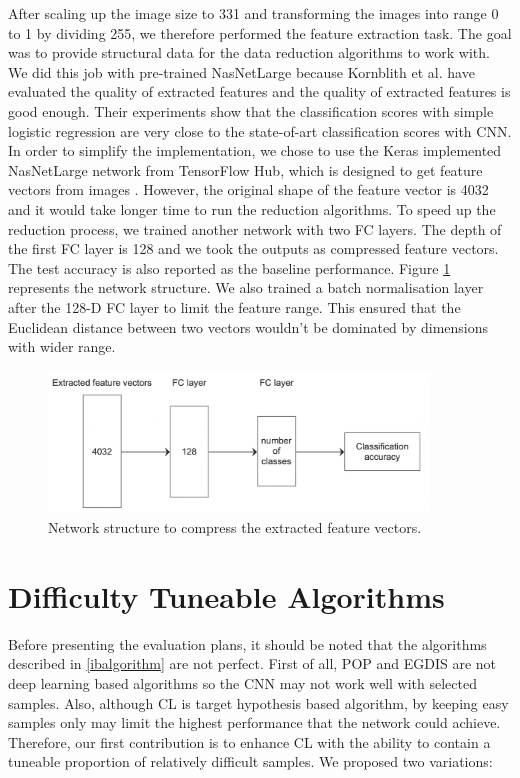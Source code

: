 After scaling up the image size to 331 and transforming the images into range 0 to 1 by dividing 255, we therefore performed the feature extraction task. The goal was to provide structural data for the data reduction algorithms to work with. We did this job with pre-trained NasNetLarge \cite{Zoph2018} because Kornblith et al. \cite{Kornblith2018} have evaluated the quality of extracted features and the quality of extracted features is good enough. Their experiments show that the classification scores with simple logistic regression are very close to the state-of-art classification scores with CNN. In order to simplify the implementation, we chose to use the Keras implemented NasNetLarge network from TensorFlow Hub, which is designed to get feature vectors from images \cite{tensorhub_nasnet}. However, the original shape of the feature vector is 4032 and it would take longer time to run the reduction algorithms. To speed up the reduction process, we trained another network with two FC layers. The depth of the first FC layer is 128 and we took the outputs as compressed feature vectors. The test accuracy is also reported as the baseline performance. Figure \ref{Fig.compress_layer} represents the network structure. We also trained a batch normalisation layer after the 128-D FC layer to limit the feature range. This ensured that the Euclidean distance between two vectors wouldn't be dominated by dimensions with wider range.


 \begin{figure}[H]
 \centering
 \includegraphics[width=0.9\textwidth]{src/compress_layer.png}
 \caption{Network structure to compress the extracted feature vectors.}
 \label{Fig.compress_layer}
 \end{figure}

\section{Difficulty Tuneable Algorithms}
Before presenting the evaluation plans, it should be noted that the algorithms described in \ref{ibalgorithm} are not perfect. First of all, POP and EGDIS are not deep learning based algorithms so the CNN may not work well with selected samples. Also, although CL is target hypothesis based algorithm, by keeping easy samples only may limit the highest performance that the network could achieve. Therefore, our first contribution is to enhance CL with the ability to contain a tuneable proportion of relatively difficult samples. We proposed two variations:

